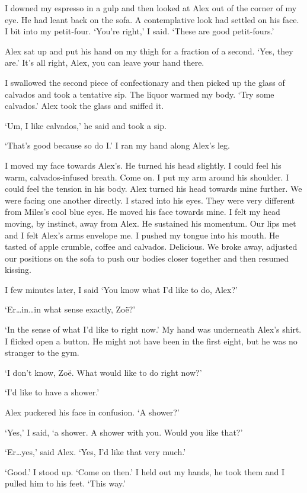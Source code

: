 I downed my espresso in a gulp and then looked at Alex out of the
corner of my eye. He had leant back on the sofa. A contemplative
look had settled on his face. I bit into my petit-four. `You're right,' I said. `These are
good petit-fours.'

Alex sat up and put his hand on my thigh for a fraction of a second.
`Yes, they are.' It's all right, Alex, you can leave your hand
there.

I swallowed the second piece of confectionary and then picked up the
glass of calvados and took a tentative sip. The liquor warmed my
body. `Try some calvados.' Alex took the glass and sniffed it.

`Um, I like calvados,' he said and took a sip.

`That's good because so do I.' I ran my hand along Alex's leg.

I moved my face towards Alex's. He turned his head slightly. I could
feel his warm, calvados-infused breath. Come on. I put my arm around
his shoulder. I could feel the tension in his body. Alex turned his
head towards mine further. We were facing one another directly. I
stared into his eyes. They were very different from Miles's cool
blue eyes. He moved his face towards mine. I felt my head moving, by
instinct, away from Alex. He sustained his momentum. Our lips met
and I felt Alex's arms envelope me. I pushed my tongue into his
mouth. He tasted of apple crumble, coffee and calvados. Delicious.
We broke away, adjusted our positions on the sofa to push our bodies
closer together and then resumed kissing.

I few minutes later, I said `You know what I'd like to do, Alex?'

`Er\dots in\dots in what sense exactly, Zoë?'

`In the sense of what I'd like to right now.' My hand was underneath
Alex's shirt. I flicked open a button. He might not have been in the
first eight, but he was no stranger to the gym.

`I don't know, Zoë. What would like to do right now?'

`I'd like to have a shower.'

Alex puckered his face in confusion. `A shower?'

`Yes,' I said, `a shower. A shower with you. Would you like that?'

`Er\dots yes,' said Alex. `Yes, I'd like that very much.'

`Good.' I stood up. `Come on then.' I held out my hands, he took
them and I pulled him to his feet. `This way.'

